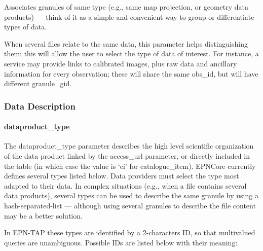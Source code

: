 \documentclass[11pt,a4paper]{ivoa}
\begin{document}
Associates granules of same type (e.g., same map projection, or geometry
data products) --- think of it as a simple and convenient way to group or
differentiate types of data.

When several files relate to the same data, this parameter helps
distinguishing them: this will allow the user to select the type of data
of interest.  For instance, a service may provide links to calibrated images,
plus raw data and ancillary information for every observation; these
will share the same obs\_id, but will have different granule\_gid.

\subsubsection{Data Description}

\paragraph{dataproduct\_type}

The dataproduct\_type parameter describes the high level scientific
organization of the data product linked by the access\_url parameter,
or directly included in the table (in which case the value is `ci'
for catalogue\_item). EPNCore currently defines several types listed
below. Data providers must select the type most adapted to their
data. In complex situations (e.g., when a file contains several data
products), several types can be used to describe the same granule by
using a hash-separated-list — although using several granules to
describe the file content may be a better solution.

In EPN-TAP these types are identified by a 2-characters ID, so that
multivalued queries are unambiguous. Possible IDs are listed below with
their meaning:
\end{document}
